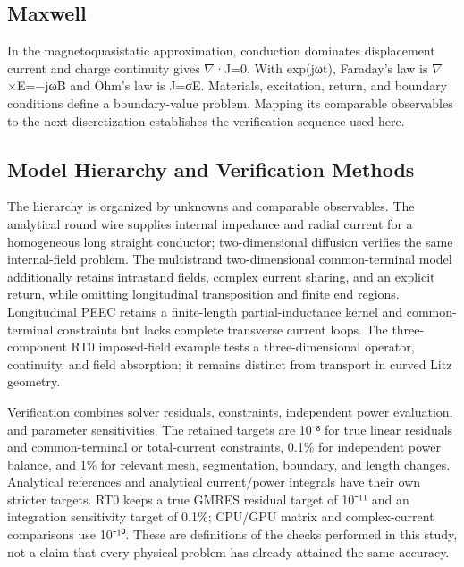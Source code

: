 \documentclass[11pt]{article}
\begin{document}
\subsection*{Maxwell}
\hypertarget{02.maxwell.heading}{}
In the magnetoquasistatic approximation, conduction dominates displacement current and charge continuity gives \(\nabla\)·J=0. With exp(jωt), Faraday’s law is \(\nabla\)×E=−jωB and Ohm’s law is J=σE. Materials, excitation, return, and boundary conditions define a boundary-value problem. Mapping its comparable observables to the next discretization establishes the verification sequence used here.


\subsection*{Model Hierarchy and Verification Methods}
\hypertarget{02.hierarchy.heading}{}
The hierarchy is organized by unknowns and comparable observables. The analytical round wire supplies internal impedance and radial current for a homogeneous long straight conductor; two-dimensional diffusion verifies the same internal-field problem. The multistrand two-dimensional common-terminal model additionally retains intrastand fields, complex current sharing, and an explicit return, while omitting longitudinal transposition and finite end regions. Longitudinal PEEC retains a finite-length partial-inductance kernel and common-terminal constraints but lacks complete transverse current loops. The three-component RT0 imposed-field example tests a three-dimensional operator, continuity, and field absorption; it remains distinct from transport in curved Litz geometry.


Verification combines solver residuals, constraints, independent power evaluation, and parameter sensitivities. The retained targets are 10⁻⁸ for true linear residuals and common-terminal or total-current constraints, 0.1\% for independent power balance, and 1\% for relevant mesh, segmentation, boundary, and length changes. Analytical references and analytical current/power integrals have their own stricter targets. RT0 keeps a true GMRES residual target of 10⁻¹¹ and an integration sensitivity target of 0.1\%; CPU/GPU matrix and complex-current comparisons use 10⁻¹⁰. These are definitions of the checks performed in this study, not a claim that every physical problem has already attained the same accuracy.
\end{document}
